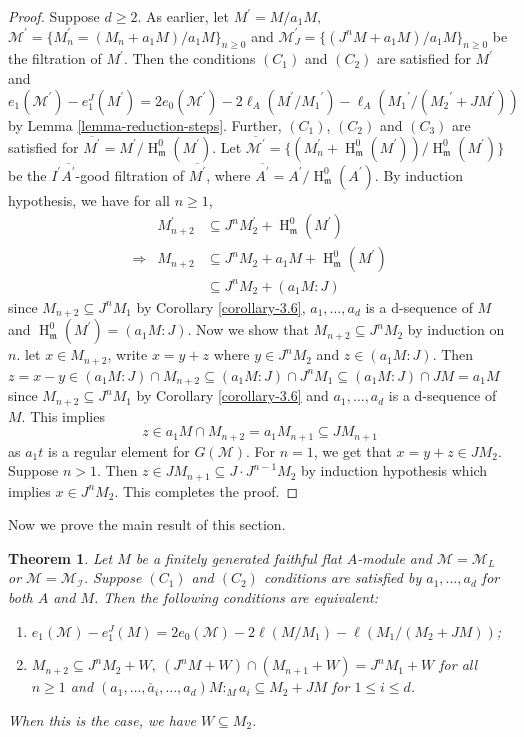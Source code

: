 \documentclass[11pt,reqno]{amsart}
\newtheorem{theorem}{Theorem}[section]
\theoremstyle{definition}
\newcommand{\m}{\mathfrak m}
\def\M{{\mathcal M}}
\def\I{{\mathcal I}}
\DeclareMathOperator{\h}{H}
\numberwithin{equation}{section}
\begin{document}
\begin{proof}
	Suppose $d\geq 2.$ As earlier, let $M^\prime=M/a_1M,$ 
	$\M^\prime=\{M_n^\prime=(M_n+a_1M)/a_1M\}_{n\geq0}$ and $\M_J^\prime=\{(J^nM+a_1M)/a_1M\}_{n\geq 0}$ be the filtration of $M^\prime$. Then the conditions  $(C_1)$ and $(C_2)$ are satisfied for $M^\prime$ and
	$e_1(\M^\prime)-e_1^J(M^\prime)=2e_0(\M^\prime)-2\ell_A(M^\prime/{M_1}^\prime)-\ell_A({M_1}^\prime/({M_2}^\prime+JM^\prime))$ by Lemma \ref{lemma-reduction-steps}.
	Further, $(C_1)$, $(C_2)$ and $(C_3)$ are satisfied for $\overline{M^\prime}=M^\prime/\h_{\m}^0(M^\prime)$. 
	Let $\overline{\M^\prime} =\{(M_n^\prime+\h_{\m}^0(M^\prime))/\h_{\m}^0(M^\prime)\}$ be the $I^\prime \overline{A^\prime}$-good filtration of $\overline{M^\prime}$, where $\overline{A^\prime}=A^\prime/\h_{\m}^0(A^\prime)$. 
	By induction hypothesis, we have for all $n\geq 1$,
	\begin{eqnarray*}
		&M_{n+2}^\prime&\subseteq  J^n M_2 ^\prime+\h_{\m}^0(M^\prime)\\
		\Rightarrow & M_{n+2} & \subseteq J^n M_2+a_1M+\h_{\m}^0(M^\prime)\\
		&& \subseteq J^n M_2+(a_1M:J)
	\end{eqnarray*}
	since $M_{n+2}\subseteq J^nM_1$ by Corollary \ref{corollary-3.6}, $a_1,\ldots,a_d$ is a d-sequence of $M$ and $\h_{\m}^0(M^\prime)=(a_1M:J)$. Now we show that $M_{n+2}\subseteq J^nM_2$ by induction on $n$. let $x\in M_{n+2}$, write $x=y+z$ where $y\in J^nM_2$ and 
	$z\in (a_1M:J)$. Then $z=x-y\in (a_1M:J)\cap M_{n+2}\subseteq (a_1M:J)\cap J^n M_1\subseteq (a_1M:J)\cap JM =a_1M$ since
	$M_{n+2}\subseteq J^nM_1$ by Corollary \ref{corollary-3.6} and $a_1,\ldots,a_d$ is a d-sequence of $M$.  This implies $$z\in a_1M\cap M_{n+2}=a_1M_{n+1}\subseteq JM_{n+1}$$ as $a_1t$ is a regular element for $G(\mathcal{M})$. 
	For $n=1$, we get that $x=y+z\in JM_2$. Suppose $n>1$. Then $z\in JM_{n+1}\subseteq J\cdot J^{n-1}M_2$ by induction hypothesis which implies $x\in J^nM_2$. This completes the proof.
\end{proof}
Now we prove the main result of this section. 
	\begin{theorem}\label{the-theorem}
     Let $M$ be a finitely generated faithful flat $A$-module and $\M=\M_L$ or $\M=\M_\I$. Suppose $(C_1)$ and $(C_2)$ conditions are satisfied by $a_1,\ldots,a_d$ for both $A$ and $M$. Then the following conditions are equivalent: 
	\begin{enumerate}
		\item \label{the-theorem-equivalent-cond-1} $e_1(\M)-e_1^J(M)=2e_0(\M)-2\ell(M/M_1)-\ell(M_1/(M_2+JM))$;
		\item \label{the-theorem-equivalent-cond-2} $M_{n+2}\subseteq J^nM_2+W,~(J^nM+W)\cap (M_{n+1}+W)=J^nM_1+W$ for all $n\geq 1$ and $(a_1,\ldots,\check{a_i},\ldots,a_d)M:_Ma_i\subseteq M_2+JM$ for $1\leq i\leq d$.
	\end{enumerate}
	When this is the case, we have $W\subseteq M_2$. 
\end{theorem}
\end{document}

